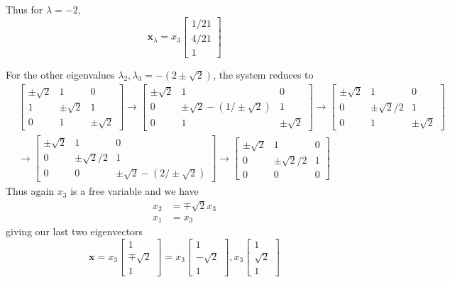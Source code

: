 \documentclass{article}
\begin{document}
\begin{solution}
Thus for $\lambda=-2$, 
\[
\mathbf{x}_{\lambda} = x_{3}\begin{bmatrix}
1/21\\
4/21\\
1
\end{bmatrix}
\]

For the other eigenvalues $\lambda_{2},\lambda_{3} = -(2\pm\sqrt{2})$, the system reduces to
\begin{align*}
&\begin{bmatrix}
\pm\sqrt{2}	&	1			&	0\\
1			&	\pm\sqrt{2}	&	1\\
0			&	1			&	\pm\sqrt{2}
\end{bmatrix}
\to
\begin{bmatrix}
\pm\sqrt{2}	&	1			&	0\\
0			&	\pm\sqrt{2}-(1/\pm\sqrt{2})	&	1\\
0			&	1			&	\pm\sqrt{2}
\end{bmatrix}
\to
\begin{bmatrix}
\pm\sqrt{2}	&	1				&	0\\
0			&	\pm\sqrt{2}/2	&	1\\
0			&	1				&	\pm\sqrt{2}
\end{bmatrix}
\\
&\to
\begin{bmatrix}
\pm\sqrt{2}	&	1				&	0\\
0			&	\pm\sqrt{2}/2	&	1\\
0			&	0				&	\pm\sqrt{2}-(2/\pm\sqrt{2})
\end{bmatrix}
\to
\begin{bmatrix}
\pm\sqrt{2}	&	1				&	0\\
0			&	\pm\sqrt{2}/2	&	1\\
0			&	0				&	0
\end{bmatrix}
\end{align*}
Thus again $x_{3}$ is a free variable and we have
\begin{align*}
x_{2} &= \mp\sqrt{2}x_{3}\\
x_{1} &= x_{3}
\end{align*}
giving our last two eigenvectors
\[
\mathbf{x} = x_{3}
\begin{bmatrix}
1\\
\mp\sqrt{2}\\
1
\end{bmatrix}
=x_{3}
\begin{bmatrix}
1\\
-\sqrt{2}\\
1
\end{bmatrix}
,x_{3}
\begin{bmatrix}
1\\
\sqrt{2}\\
1
\end{bmatrix}
\]


\end{solution}
\end{document}
